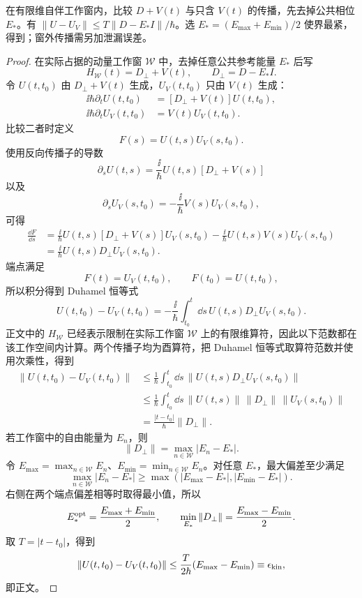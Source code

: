 \begin{proposition}[有限谱窗内去掉自由色散的误差]
在有限维自伴工作窗内，比较 $D+V(t)$ 与只含 $V(t)$ 的传播，先去掉公共相位 $E_*$。有 $\|U-U_V\|\le T\|D-E_*I\|/\hbar$。选 $E_*=(E_{\max}+E_{\min})/2$ 使界最紧，得到；窗外传播需另加泄漏误差。
\end{proposition}
\begin{proof}
在实际占据的动量工作窗 $\mathcal W$ 中，去掉任意公共参考能量 $E_*$ 后写
\[
H_{\mathcal W}(t)=D_\perp+V(t),
\qquad
D_\perp=D-E_*I.
\]
令 $U(t,t_0)$ 由 $D_\perp+V(t)$ 生成，$U_V(t,t_0)$ 只由 $V(t)$ 生成：
\begin{align*}
\ii\hbar\partial_tU(t,t_0)&=[D_\perp+V(t)]U(t,t_0),\\
\ii\hbar\partial_tU_V(t,t_0)&=V(t)U_V(t,t_0).
\end{align*}
比较二者时定义
\[
F(s)=U(t,s)U_V(s,t_0).
\]
使用反向传播子的导数
\[
\partial_sU(t,s)=\frac{\ii}{\hbar}U(t,s)[D_\perp+V(s)]
\]
以及
\[
\partial_sU_V(s,t_0)=-\frac{\ii}{\hbar}V(s)U_V(s,t_0),
\]
可得
\begin{align*}
\frac{\dd F}{\dd s}
&=\frac{\ii}{\hbar}U(t,s)[D_\perp+V(s)]U_V(s,t_0)
-\frac{\ii}{\hbar}U(t,s)V(s)U_V(s,t_0)\\
&=\frac{\ii}{\hbar}U(t,s)D_\perp U_V(s,t_0).
\end{align*}
端点满足
\[
F(t)=U_V(t,t_0),
\qquad
F(t_0)=U(t,t_0),
\]
所以积分得到 Duhamel 恒等式
\[
U(t,t_0)-U_V(t,t_0)
=-\frac{\ii}{\hbar}\int_{t_0}^{t}\dd s\,
U(t,s)D_\perp U_V(s,t_0).
\]
正文中的 $H_{\mathcal W}$ 已经表示限制在实际工作窗 $\mathcal W$ 上的有限维算符，因此以下范数都在该工作空间内计算。两个传播子均为酉算符，把 Duhamel 恒等式取算符范数并使用次乘性，得到
\begin{align*}
\|U(t,t_0)-U_V(t,t_0)\|
&\le\frac1\hbar\int_{t_0}^{t}\dd s\,
\|U(t,s)D_\perp U_V(s,t_0)\|\\
&\le\frac1\hbar\int_{t_0}^{t}\dd s\,
\|U(t,s)\|\,\|D_\perp\|\,\|U_V(s,t_0)\|\\
&=\frac{|t-t_0|}{\hbar}\|D_\perp\|.
\end{align*}
若工作窗中的自由能量为 $E_n$，则
\[
\|D_\perp\|=\max_{n\in\mathcal W}|E_n-E_*|.
\]
令 $E_{\max}=\max_{n\in\mathcal W}E_n$、$E_{\min}=\min_{n\in\mathcal W}E_n$。对任意 $E_*$，最大偏差至少满足
\[
\max_{n\in\mathcal W}|E_n-E_*|
\ge \max(|E_{\max}-E_*|,|E_{\min}-E_*|).
\]
右侧在两个端点偏差相等时取得最小值，所以
\[
E_*^{\rm opt}=\frac{E_{\max}+E_{\min}}2,
\qquad
\min_{E_*}\|D_\perp\|
=\frac{E_{\max}-E_{\min}}2.
\]
取 $T=|t-t_0|$，得到
\[
\|U(t,t_0)-U_V(t,t_0)\|
\le\frac{T}{2\hbar}(E_{\max}-E_{\min})
\equiv\epsilon_{\rm kin},
\]
即正文。
\end{proof}


